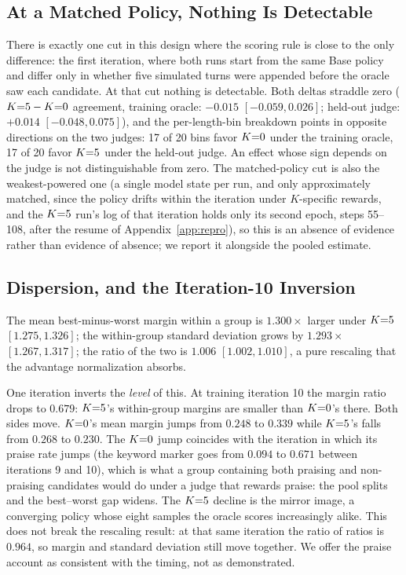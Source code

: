 \subsection{At a Matched Policy, Nothing Is Detectable}

There is exactly one cut in this design where the scoring rule is close to the only difference: the
first iteration, where both runs start from the same Base policy and differ only in whether five
simulated turns were appended before the oracle saw each candidate. At that cut nothing is
detectable. Both deltas straddle zero ($K{=}5 - K{=}0$ agreement, training oracle: $-0.015$
$[-0.059, 0.026]$; held-out judge: $+0.014$ $[-0.048, 0.075]$), and the per-length-bin breakdown
points in opposite directions on the two judges: 17 of 20 bins favor $K{=}0$ under the training
oracle, 17 of 20 favor $K{=}5$ under the held-out judge. An effect whose sign depends on the judge
is not distinguishable from zero. The matched-policy cut is also the weakest-powered one (a single
model state per run, and only approximately matched, since the policy drifts within the iteration
under $K$-specific rewards, and the $K{=}5$ run's log of that iteration holds only its second epoch,
steps 55--108, after the resume of Appendix~\ref{app:repro}), so this is an absence of evidence
rather than evidence of absence; we report it alongside the pooled estimate.

\subsection{Dispersion, and the Iteration-10 Inversion}

The mean best-minus-worst margin within a group is $1.300\times$ larger under $K{=}5$
$[1.275, 1.326]$; the within-group standard deviation grows by $1.293\times$ $[1.267, 1.317]$; the
ratio of the two is $1.006$ $[1.002, 1.010]$, a pure rescaling that the advantage normalization
absorbs.

One iteration inverts the \emph{level} of this. At training iteration 10 the margin ratio drops to
$0.679$: $K{=}5$'s within-group margins are smaller than $K{=}0$'s there. Both sides move. $K{=}0$'s mean
margin jumps from $0.248$ to $0.339$ while $K{=}5$'s falls from $0.268$ to $0.230$. The $K{=}0$ jump
coincides with the iteration in which its praise rate jumps (the keyword marker goes
from $0.094$ to $0.671$ between iterations 9 and 10), which is what a group containing both
praising and non-praising candidates would do under a judge that rewards praise: the
pool splits and the best--worst gap widens. The $K{=}5$ decline is the mirror image, a converging policy
whose eight samples the oracle scores increasingly alike. This does not break the rescaling result:
at that same iteration the ratio of ratios is $0.964$, so margin and standard deviation still move
together. We offer the praise account as consistent with the timing, not as demonstrated.

